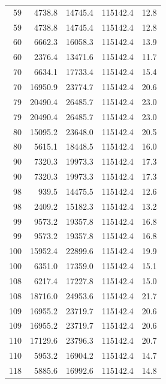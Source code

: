 \begin{longtable}{rrrrr}
    59 & \num{4738.8} & \num{14745.4} & \num{115142.4} & 12.8 \\
    59 & \num{4738.8} & \num{14745.4} & \num{115142.4} & 12.8 \\
    60 & \num{6662.3} & \num{16058.3} & \num{115142.4} & 13.9 \\
    60 & \num{2376.4} & \num{13471.6} & \num{115142.4} & 11.7 \\
    70 & \num{6634.1} & \num{17733.4} & \num{115142.4} & 15.4 \\
    70 & \num{16950.9} & \num{23774.7} & \num{115142.4} & 20.6 \\
    79 & \num{20490.4} & \num{26485.7} & \num{115142.4} & 23.0 \\
    79 & \num{20490.4} & \num{26485.7} & \num{115142.4} & 23.0 \\
    80 & \num{15095.2} & \num{23648.0} & \num{115142.4} & 20.5 \\
    80 & \num{5615.1} & \num{18448.5} & \num{115142.4} & 16.0 \\
    90 & \num{7320.3} & \num{19973.3} & \num{115142.4} & 17.3 \\
    90 & \num{7320.3} & \num{19973.3} & \num{115142.4} & 17.3 \\
    98 & \num{939.5} & \num{14475.5} & \num{115142.4} & 12.6 \\
    98 & \num{2409.2} & \num{15182.3} & \num{115142.4} & 13.2 \\
    99 & \num{9573.2} & \num{19357.8} & \num{115142.4} & 16.8 \\
    99 & \num{9573.2} & \num{19357.8} & \num{115142.4} & 16.8 \\
    100 & \num{15952.4} & \num{22899.6} & \num{115142.4} & 19.9 \\
    100 & \num{6351.0} & \num{17359.0} & \num{115142.4} & 15.1 \\
    108 & \num{6217.4} & \num{17227.8} & \num{115142.4} & 15.0 \\
    108 & \num{18716.0} & \num{24953.6} & \num{115142.4} & 21.7 \\
    109 & \num{16955.2} & \num{23719.7} & \num{115142.4} & 20.6 \\
    109 & \num{16955.2} & \num{23719.7} & \num{115142.4} & 20.6 \\
    110 & \num{17129.6} & \num{23796.3} & \num{115142.4} & 20.7 \\
    110 & \num{5953.2} & \num{16904.2} & \num{115142.4} & 14.7 \\
    118 & \num{5885.6} & \num{16992.6} & \num{115142.4} & 14.8 \\

\end{longtable}
